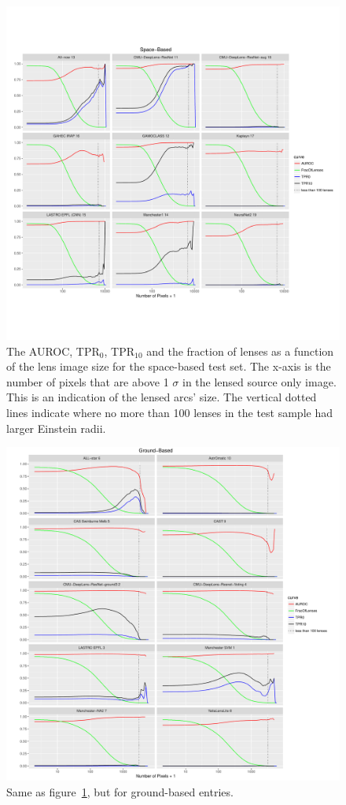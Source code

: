 \documentclass{aa}
\begin{document}
\begin{figure}
\includegraphics[width=2\columnwidth]{figures/npixel_space.pdf}
 \caption{The AUROC, TPR$_0$, TPR$_{10}$ and the fraction of lenses as a function of the lens image size for the space-based test set.  The x-axis is the number of pixels that are above 1 $\sigma$ in the lensed source only image.  This is an indication of the lensed arcs' size.  The vertical dotted lines indicate where no more than 100 lenses in the test sample had larger Einstein radii. 
 }
 \label{fig:npixel_space}
\end{figure}

\begin{figure}
 \includegraphics[width=2\columnwidth]{figures/npixel_ground.pdf}
 \caption{Same as figure~\ref{fig:npixel_space}, but for ground-based entries.}
 \label{fig:npixel_ground}
\end{figure}
\end{document}
